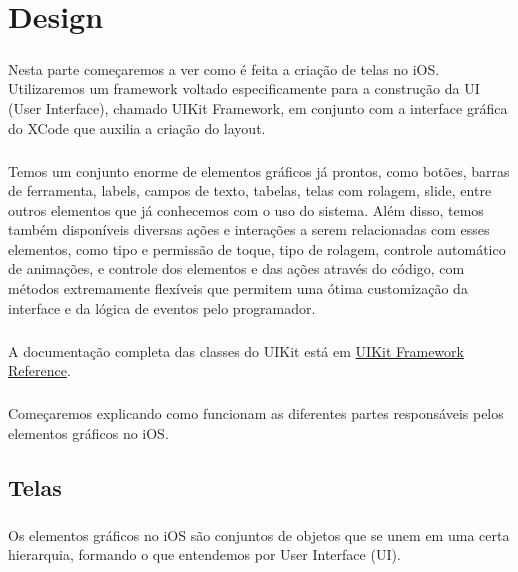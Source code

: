 \documentclass[a4paper,12pt,brazil,doubleside]{book}
\begin{document}
\bigskip
\bigskip


\chapter{Design}

\paragraph{}Nesta parte começaremos a ver como é feita a criação de telas no iOS. Utilizaremos um framework voltado especificamente para a construção da UI (User Interface), chamado UIKit Framework, em conjunto com a interface gráfica do XCode que auxilia a criação do layout.
\paragraph{}Temos um conjunto enorme de elementos gráficos já prontos, como botões, barras de ferramenta, labels, campos de texto, tabelas, telas com rolagem, slide, entre outros elementos que já conhecemos com o uso do sistema. Além disso, temos também disponíveis diversas ações e interações a serem relacionadas com esses elementos, como tipo e permissão de toque, tipo de rolagem, controle automático de animações, e controle dos elementos e das ações através do código, com métodos extremamente flexíveis que permitem uma ótima customização da interface e da lógica de eventos pelo programador.

\paragraph{}A documentação completa das classes do UIKit está em 
\href{http://developer.apple.com/library/ios/#documentation/uikit/reference/UIKit_Framework/_index.html}{UIKit Framework Reference}.

\paragraph{}Começaremos explicando como funcionam as diferentes partes responsáveis pelos elementos gráficos no iOS.

\bigskip
\bigskip


\section{Telas}

\paragraph{}Os elementos gráficos no iOS são conjuntos de objetos que se unem em uma certa hierarquia, formando o que entendemos por User Interface (UI).
\end{document}
